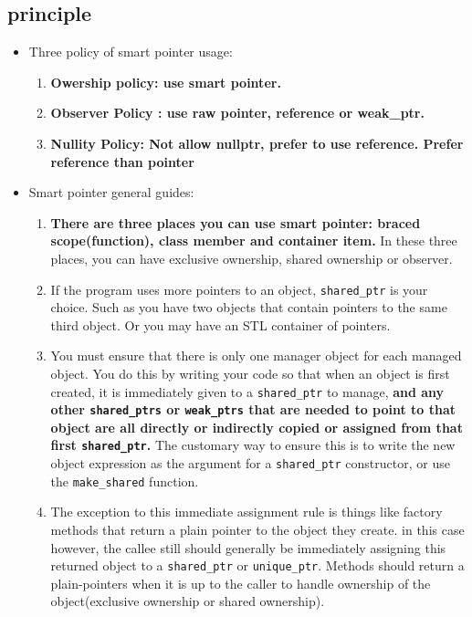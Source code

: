 \documentclass[a4paper,11pt,twoside]{book}
\begin{document}
\subsection{principle}

\begin{itemize}
\item Three policy of smart pointer usage:
\begin{enumerate}
	\item \textbf{Owership policy: use smart pointer.}
	\item \textbf{Observer Policy : use raw pointer, reference or weak\_ptr.}
	\item \textbf{Nullity Policy: Not allow nullptr, prefer to use reference. Prefer reference than pointer}
\end{enumerate}

\item Smart pointer general guides:
\begin{enumerate}
\item \textbf{There are three places you can use smart pointer: braced scope(function), class member and container item.} In these three places, you can have exclusive ownership, shared ownership or observer.

\item If the program uses more pointers to an object, \texttt{shared\_ptr} is your choice.  Such as you have two objects that contain pointers to the same third object. Or you may have an STL container of pointers.

\item You must ensure that there is only one manager object for each managed object. You do this by writing your code so that when an object is first created, it is immediately given to a \texttt{shared\_ptr} to manage, \textbf{and any other \texttt{shared\_ptrs} or \texttt{weak\_ptrs} that are needed to point to that object are all directly or indirectly copied or assigned from that first \texttt{shared\_ptr}.} The customary way to ensure this is to write the new object expression as the argument for a \texttt{shared\_ptr} constructor, or use the \texttt{make\_shared} function.

\item The exception to this immediate assignment rule is things like factory methods that return a plain pointer to the object they create. in this case however, the callee still should generally be immediately assigning this returned object to a \texttt{shared\_ptr} or \texttt{unique\_ptr}.  Methods should return a plain-pointers when it is up to the caller to handle ownership of the object(exclusive ownership or shared ownership).


\end{enumerate}
\end{itemize}
\end{document}
